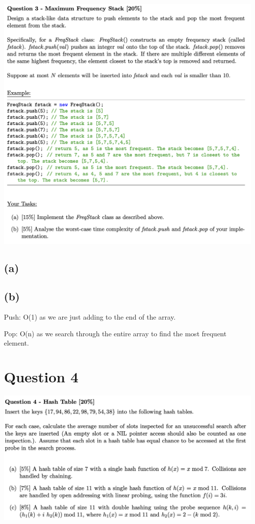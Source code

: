 \documentclass{article}
\begin{document}
\includegraphics[width=\linewidth]{img/3.png}

\subsection*{(a)}



\subsection*{(b)}

Push: O(1) as we are just adding to the end of the array.

Pop: O(n) as we search through the entire array to find the most frequent element.

\section*{Question 4}

\includegraphics[width=\linewidth]{img/4.png}
\end{document}
